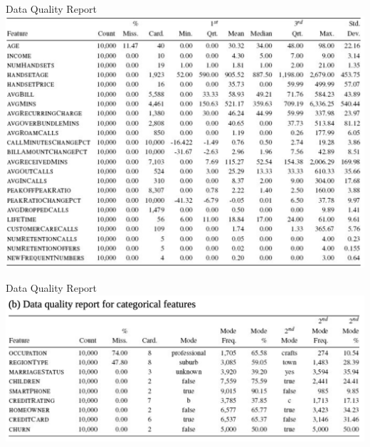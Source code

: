 \documentclass[aspectratio=169,xcolor=dvipsnames]{beamer}
\begin{document}
\begin{frame}{Data Quality Report}
\centering
\includegraphics[scale=0.3]{images/data_qual_1.png}
\end{frame}

\begin{frame}{Data Quality Report}
\centering
\includegraphics[scale=0.45]{images/data_qual_cat.png}
\end{frame}
\end{document}

